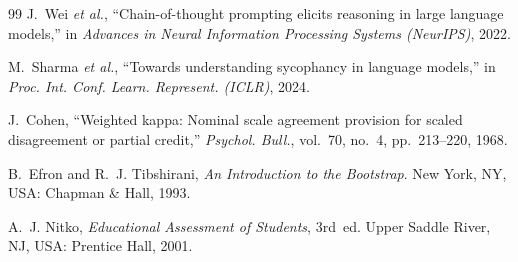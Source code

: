 \documentclass[conference]{IEEEtran}
\begin{document}
\begin{thebibliography}{99}
J.~Wei \emph{et al.}, ``Chain-of-thought prompting elicits reasoning in large language models,''
in \emph{Advances in Neural Information Processing Systems (NeurIPS)}, 2022.

M.~Sharma \emph{et al.}, ``Towards understanding sycophancy in language models,'' in \emph{Proc.
Int. Conf. Learn. Represent. (ICLR)}, 2024.

J.~Cohen, ``Weighted kappa: Nominal scale agreement provision for scaled disagreement or partial
credit,'' \emph{Psychol. Bull.}, vol.~70, no.~4, pp.~213--220, 1968.

B.~Efron and R.~J. Tibshirani, \emph{An Introduction to the Bootstrap}. New York, NY, USA:
Chapman \& Hall, 1993.

A.~J. Nitko, \emph{Educational Assessment of Students}, 3rd~ed. Upper Saddle River, NJ, USA:
Prentice Hall, 2001.

\end{thebibliography}
\end{document}
